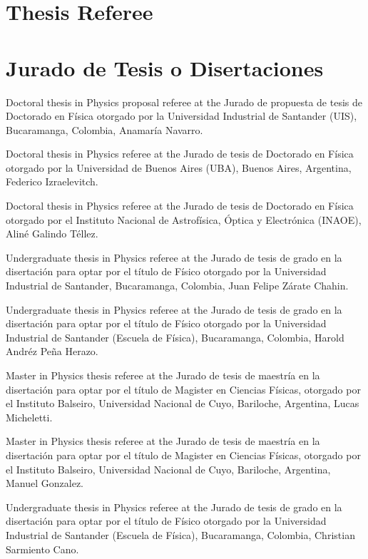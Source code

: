 

\ifeng
  \section*{Thesis Referee}
\else
  \section*{Jurado de Tesis o Disertaciones}
\fi

\ifeng
Doctoral thesis in Physics proposal referee at the 
\else
Jurado de propuesta de tesis de Doctorado en Física otorgado por la 
\fi
Universidad Industrial de Santander (UIS), Bucaramanga, Colombia, Anamaría Navarro.

\ifeng
Doctoral thesis in Physics referee at the 
\else
Jurado de tesis de Doctorado en Física otorgado por la 
\fi
Universidad de Buenos Aires (UBA), Buenos Aires, Argentina, Federico Izraelevitch.

\ifeng
Doctoral thesis in Physics referee at the 
\else
Jurado de tesis de Doctorado en Física otorgado por el 
\fi
Instituto Nacional de Astrofísica, Óptica y Electrónica (INAOE), Aliné Galindo Téllez.

\ifeng
Undergraduate thesis in Physics referee at the  
\else
Jurado de tesis de grado en la disertación para optar por el título de Físico otorgado por la 
\fi
Universidad Industrial de Santander, Bucaramanga, Colombia, Juan Felipe Zárate Chahin.

\ifeng
Undergraduate thesis in Physics referee at the  
\else
Jurado de tesis de grado en la disertación para optar por el título de Físico otorgado por la 
\fi
Universidad Industrial de Santander (Escuela de Física), Bucaramanga, Colombia, Harold Andréz Peña Herazo.

\ifeng
Master in Physics thesis referee at the
\else
Jurado de tesis de maestría en la disertación para optar por el título de Magister en Ciencias Físicas, otorgado por el 
\fi
Instituto Balseiro, Universidad Nacional de Cuyo, Bariloche, Argentina, Lucas Micheletti.

\ifeng
Master in Physics thesis referee at the
\else
Jurado de tesis de maestría en la disertación para optar por el título de Magister en Ciencias Físicas, otorgado por el 
\fi
Instituto Balseiro, Universidad Nacional de Cuyo, Bariloche, Argentina, Manuel Gonzalez.

\ifeng
Undergraduate thesis in Physics referee at the  
\else
Jurado de tesis de grado en la disertación para optar por el título de Físico otorgado por la 
\fi
Universidad Industrial de Santander (Escuela de Física), Bucaramanga, Colombia, Christian Sarmiento Cano.
